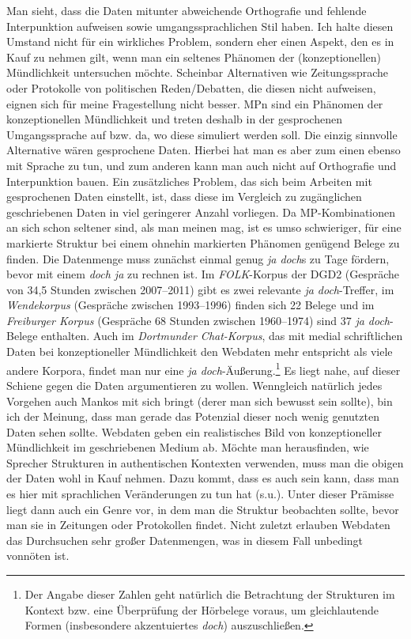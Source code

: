 Man sieht, dass die Daten mitunter abweichende Orthografie und fehlende Interpunktion aufweisen sowie umgangssprachlichen Stil haben. Ich halte diesen Umstand nicht für ein wirkliches Problem, sondern eher einen Aspekt, den es in Kauf zu nehmen gilt, wenn man ein seltenes Phänomen der (konzeptionellen) Mündlichkeit untersuchen möchte. Scheinbar   Alternativen wie Zei\-tungssprache oder Protokolle von politischen Reden/Debatten, die diesen   nicht aufweisen, eignen sich für meine Fragestellung nicht besser. MPn sind ein Phäno\-men der konzeptionellen Mündlichkeit und treten deshalb in der gesprochenen Umgangs\-sprache auf bzw. da, wo diese simuliert werden soll. Die einzig sinn\-volle Alternative wären gesprochene Daten. Hierbei hat man es aber zum einen ebenso mit   Sprache zu tun, und zum anderen kann man auch nicht auf Orthografie und Interpunktion bauen. Ein zusätzliches Problem, das sich beim Arbeiten mit gesprochenen Daten einstellt, ist, dass diese im Ver\-gleich zu zugängli\-chen geschriebenen Daten in viel geringerer Anzahl vorliegen. Da MP-Kombina\-tionen an sich schon seltener sind, als man meinen mag, ist es umso schwieriger, für eine markierte Struktur bei einem ohnehin markierten Phänomen genügend Belege zu finden. Die Datenmenge muss zunächst einmal genug \textit{ja doch}s zu Tage fördern, bevor mit einem \textit{doch ja} zu rechnen ist. Im \textit{FOLK}-Korpus der DGD2 (Gespräche von 34,5 Stunden zwischen 2007–2011) gibt es zwei relevante \textit{ja doch}-Treffer, im \textit{Wendekorpus} (Gespräche zwischen 1993–1996) finden sich 22 Belege und im \textit{Freiburger Korpus} (Gespräche 68 Stunden zwischen 1960–1974) sind 37 \textit{ja doch}-Belege enthalten. Auch im \textit{Dortmunder Chat-Korpus}, das mit medial schriftlichen Daten bei konzeptioneller Mündlichkeit den Webdaten mehr entspricht als viele andere Korpora, findet man nur eine \textit{ja doch}-Äußerung.\footnote{Der Angabe dieser Zahlen geht natürlich die Betrachtung der Strukturen im Kontext bzw. eine Überprüfung der Hörbelege voraus, um gleichlautende Formen (insbesondere akzentuiertes \textit{doch}) auszuschließen.} Es liegt nahe, auf dieser Schiene gegen die Daten argumentieren zu wollen. Wenngleich natürlich jedes Vorgehen auch Mankos mit sich bringt (derer man sich bewusst sein sollte), bin ich der Meinung, dass man gerade das Potenzial dieser noch wenig genutzten Daten sehen sollte. Webdaten geben ein realistisches Bild von konzeptioneller Mündlichkeit  im geschriebenen Medium ab. Möchte man herausfinden, wie Spre\-cher Strukturen in authentischen Kontexten verwenden, muss man die obigen   der Daten wohl in Kauf nehmen. Dazu kommt, dass es auch sein kann, dass man es hier mit sprachlichen Veränderungen zu tun hat (s.u.). Unter dieser Prämisse liegt dann auch ein Genre vor, in dem man die Struktur beobachten sollte, bevor man sie in Zeitungen oder Protokollen findet. Nicht zuletzt erlauben Webdaten das Durchsuchen sehr großer Datenmengen, was in diesem Fall unbedingt vonnöten ist. 

